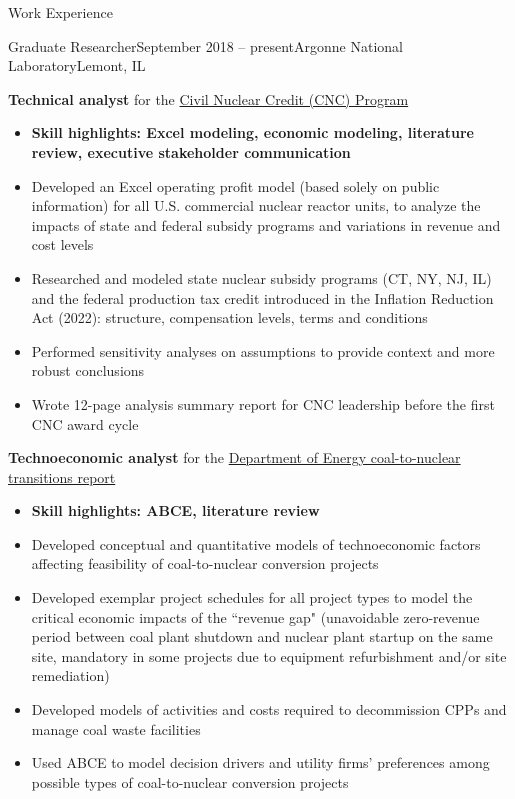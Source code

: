 \documentclass{resume} %
\begin{document}
\begin{rSection}{Work Experience}
\begin{rSubsection}{Graduate Researcher}{September 2018 -- present}{Argonne National Laboratory}{Lemont, IL}
  \item \textbf{Technical analyst} for the \href{https://www.energy.gov/gdo/civil-nuclear-credit-program}{Civil Nuclear Credit (CNC) Program}
  \begin{itemize}
    \setlength{\itemsep}{-3pt}
    \item \textbf{Skill highlights: Excel modeling, economic modeling, literature review, executive stakeholder communication}
    \item Developed an Excel operating profit model (based solely on public information) for all U.S. commercial nuclear reactor units, to analyze the impacts of state and federal subsidy programs and variations in revenue and cost levels
    \item Researched and modeled state nuclear subsidy programs (CT, NY, NJ, IL) and the federal production tax credit introduced in the Inflation Reduction Act (2022): structure, compensation levels, terms and conditions
    \item Performed sensitivity analyses on assumptions to provide context and more robust conclusions
    \item Wrote 12-page analysis summary report for CNC leadership before the first CNC award cycle
  \end{itemize}

  \item \textbf{Technoeconomic analyst} for the \href{https://www.energy.gov/ne/articles/doe-report-finds-hundreds-retiring-coal-plant-sites-could-convert-nuclear}{Department of Energy coal-to-nuclear transitions report}
  \begin{itemize}
    \setlength{\itemsep}{-3pt}
    \item \textbf{Skill highlights: ABCE, literature review}
    \item Developed conceptual and quantitative models of technoeconomic factors affecting feasibility of coal-to-nuclear conversion projects
    \item Developed exemplar project schedules for all project types to model the critical economic impacts of the ``revenue gap" (unavoidable zero-revenue period between coal plant shutdown and nuclear plant startup on the same site, mandatory in some projects due to equipment refurbishment and/or site remediation)
    \item Developed models of activities and costs required to decommission CPPs and manage coal waste facilities
    \item Used ABCE to model decision drivers and utility firms' preferences among possible types of coal-to-nuclear conversion projects
  \end{itemize}


\end{rSubsection}
\end{rSection}
\end{document}
